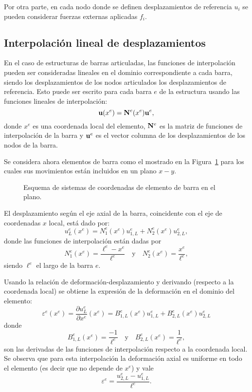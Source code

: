Por otra parte, en cada nodo donde se definen desplazamientos de referencia $u_i$ se pueden considerar fuerzas externas aplicadas $f_i$.

\subsection{Interpolación lineal de desplazamientos}

En el caso de estructuras de barras articuladas, las funciones de interpolación pueden ser consideradas lineales en el dominio correspondiente a cada barra, siendo los desplazamientos de los nodos articulados los desplazamientos de referencia. %
%
Esto puede ser escrito para cada barra $e$ de la estructura usando las funciones lineales de interpolación:
%
\begin{equation}
{\bf u} (x^e) = {\bf N}^e(x^e) {\bf u}^e,
\end{equation}
%
donde $x^e$ es una coordenada local del elemento, ${\bf N}^e$ es la matriz de funciones de interpolación de la barra y ${\bf u}^e$ es el vector columna de los desplazamientos de los nodos de la barra. %
%


Se considera ahora elementos de barra como el mostrado en la Figura~\ref{fig:eleplabar} para los cuales sus movimientos están incluidos en un plano $x-y$. %
%
\begin{figure}[htb]
	\centering
  \def\svgwidth{0.7\textwidth}
  
	\caption{Esquema de sistemas de coordenadas de elemento de barra en el plano.}
	\label{fig:eleplabar}
\end{figure}

El desplazamiento según el eje axial de la barra, coincidente con el eje de coordenadas $x$ local, está dado por:
%
\begin{equation}
u_L^e(x^e) = N_1^e(x^e) u_{1,L}^e  + N_2^e(x^e) u_{2,L}^e,
\end{equation}
%
donde las funciones de interpolación están dadas por
%
\begin{equation}
N_1^e(x^e) = \frac{\ell^e - x^e}{\ell^e}
\quad \text{y} \quad N_2^e(x^e) = \frac{x^e}{\ell^e},
\end{equation}
%
siendo $\ell^e$ el largo de la barra $e$.


%
Usando la relación de deformación-desplazamiento y derivando (respecto a la coordenada local) se obtiene la expresión de la deformación en el dominio del elemento:
%
\begin{equation}
\varepsilon^e(x^e) = \frac{\partial u^e_L}{\partial x^e}(x^e) =  B_{1,L}^e(x^e) u_{1,L}^e  + B_{2,L}^e(x^e) u_{2,L}^e
\end{equation}
%
donde 
\begin{equation}
B_{1,L}^e(x^e) = \frac{- 1}{\ell^e}
\quad \text{y} \quad B_{2,L}^e(x^e) = \frac{1}{\ell^e},
\end{equation}
son las derivadas de las funciones de interpolación respecto a la coordenada local. %
%
Se observa que para esta interpolación la deformación axial es uniforme en todo el elemento (es decir que no depende de $x^e$) y vale 
%
\begin{equation}
\varepsilon^e  =  \frac{ u_{2,L}^e - u_{1,L}^e } {\ell^e}.
\end{equation}


